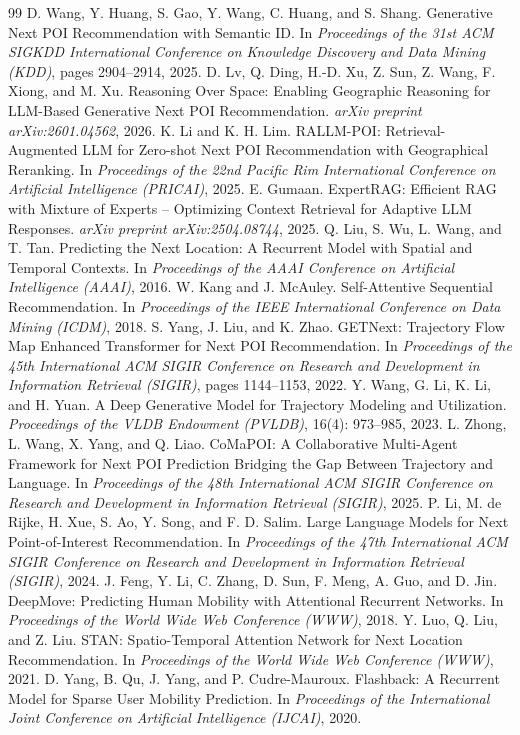 \documentclass[10pt,twocolumn]{article}
\begin{document}
\begin{thebibliography}{99}
\small
{} D. Wang, Y. Huang, S. Gao, Y. Wang, C. Huang, and S. Shang. Generative Next POI Recommendation with Semantic ID. In \emph{Proceedings of the 31st ACM SIGKDD International Conference on Knowledge Discovery and Data Mining (KDD)}, pages 2904--2914, 2025.
 D. Lv, Q. Ding, H.-D. Xu, Z. Sun, Z. Wang, F. Xiong, and M. Xu. Reasoning Over Space: Enabling Geographic Reasoning for LLM-Based Generative Next POI Recommendation. \emph{arXiv preprint arXiv:2601.04562}, 2026.
 K. Li and K. H. Lim. RALLM-POI: Retrieval-Augmented LLM for Zero-shot Next POI Recommendation with Geographical Reranking. In \emph{Proceedings of the 22nd Pacific Rim International Conference on Artificial Intelligence (PRICAI)}, 2025.
 E. Gumaan. ExpertRAG: Efficient RAG with Mixture of Experts -- Optimizing Context Retrieval for Adaptive LLM Responses. \emph{arXiv preprint arXiv:2504.08744}, 2025.
 Q. Liu, S. Wu, L. Wang, and T. Tan. Predicting the Next Location: A Recurrent Model with Spatial and Temporal Contexts. In \emph{Proceedings of the AAAI Conference on Artificial Intelligence (AAAI)}, 2016.
 W. Kang and J. McAuley. Self-Attentive Sequential Recommendation. In \emph{Proceedings of the IEEE International Conference on Data Mining (ICDM)}, 2018.
 S. Yang, J. Liu, and K. Zhao. GETNext: Trajectory Flow Map Enhanced Transformer for Next POI Recommendation. In \emph{Proceedings of the 45th International ACM SIGIR Conference on Research and Development in Information Retrieval (SIGIR)}, pages 1144--1153, 2022.
 Y. Wang, G. Li, K. Li, and H. Yuan. A Deep Generative Model for Trajectory Modeling and Utilization. \emph{Proceedings of the VLDB Endowment (PVLDB)}, 16(4): 973--985, 2023.
 L. Zhong, L. Wang, X. Yang, and Q. Liao. CoMaPOI: A Collaborative Multi-Agent Framework for Next POI Prediction Bridging the Gap Between Trajectory and Language. In \emph{Proceedings of the 48th International ACM SIGIR Conference on Research and Development in Information Retrieval (SIGIR)}, 2025.
 P. Li, M. de Rijke, H. Xue, S. Ao, Y. Song, and F. D. Salim. Large Language Models for Next Point-of-Interest Recommendation. In \emph{Proceedings of the 47th International ACM SIGIR Conference on Research and Development in Information Retrieval (SIGIR)}, 2024.
 J. Feng, Y. Li, C. Zhang, D. Sun, F. Meng, A. Guo, and D. Jin. DeepMove: Predicting Human Mobility with Attentional Recurrent Networks. In \emph{Proceedings of the World Wide Web Conference (WWW)}, 2018.
 Y. Luo, Q. Liu, and Z. Liu. STAN: Spatio-Temporal Attention Network for Next Location Recommendation. In \emph{Proceedings of the World Wide Web Conference (WWW)}, 2021.
 D. Yang, B. Qu, J. Yang, and P. Cudre-Mauroux. Flashback: A Recurrent Model for Sparse User Mobility Prediction. In \emph{Proceedings of the International Joint Conference on Artificial Intelligence (IJCAI)}, 2020.
\end{thebibliography}
\end{document}
